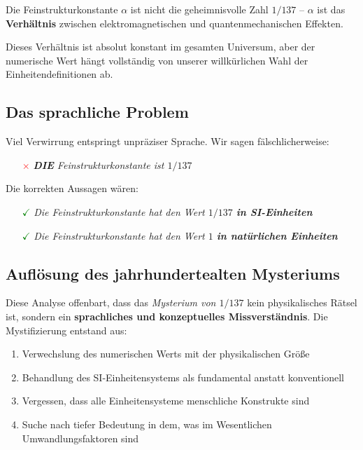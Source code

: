 \documentclass[12pt,a4paper]{article}
\begin{document}
	Die Feinstrukturkonstante $\alpha$ ist nicht die geheimnisvolle Zahl \textit{$1/137$} -- $\alpha$ ist das \textbf{Verhältnis} zwischen elektromagnetischen und quantenmechanischen Effekten.
	
	Dieses Verhältnis ist absolut konstant im gesamten Universum, aber der numerische Wert hängt vollständig von unserer willkürlichen Wahl der Einheitendefinitionen ab.
	
	\subsection{Das sprachliche Problem}
	
	Viel Verwirrung entspringt unpräziser Sprache. Wir sagen fälschlicherweise:
	\begin{itemize}
		\item[\textcolor{red}{$\times$}] \textit{\textbf{DIE} Feinstrukturkonstante ist $1/137$}
	\end{itemize}
	
	Die korrekten Aussagen wären:
	\begin{itemize}
		\item[\textcolor{green}{$\checkmark$}] \textit{Die Feinstrukturkonstante hat den Wert $1/137$ \textbf{in SI-Einheiten}}
		\item[\textcolor{green}{$\checkmark$}] \textit{Die Feinstrukturkonstante hat den Wert $1$ \textbf{in natürlichen Einheiten}}
	\end{itemize}
	
	\subsection{Auflösung des jahrhundertealten Mysteriums}
	
	Diese Analyse offenbart, dass das \textit{Mysterium von $1/137$} kein physikalisches Rätsel ist, sondern ein \textbf{sprachliches und konzeptuelles Missverständnis}. Die Mystifizierung entstand aus:
	
	\begin{enumerate}
		\item Verwechslung des numerischen Werts mit der physikalischen Größe
		\item Behandlung des SI-Einheitensystems als fundamental anstatt konventionell
		\item Vergessen, dass alle Einheitensysteme menschliche Konstrukte sind
		\item Suche nach tiefer Bedeutung in dem, was im Wesentlichen Umwandlungsfaktoren sind
	\end{enumerate}
	
\end{document}
